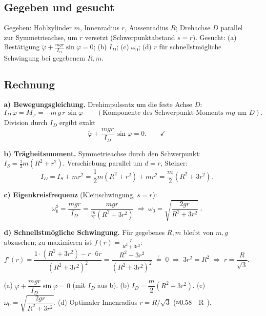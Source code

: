 
\subsection*{Gegeben und gesucht}
Gegeben: Hohlzylinder $m$, Innenradius $r$, Aussenradius $R$; Drehachse $D$
parallel zur Symmetrieachse, um $r$ versetzt (Schwerpunktabstand $s=r$).
Gesucht: (a) Bestätigung $\ddot\varphi+\frac{mgr}{I_D}\sin\varphi=0$;
(b) $I_D$; (c) $\omega_0$; (d) $r$ für schnellstmögliche Schwingung bei
gegebenem $R,m$.

\subsection*{Rechnung}
\textbf{a) Bewegungsgleichung.} Drehimpulssatz um die feste Achse $D$:
\begin{equation}
  I_D\,\ddot\varphi = M_\varphi = -m\,g\,r\,\sin\varphi
  \qquad(\text{Komponente des Schwerpunkt-Moments } m g \text{ um }D).
\end{equation}
Division durch $I_D$ ergibt exakt
\begin{equation}
  \ddot\varphi + \frac{m g r}{I_D}\,\sin\varphi = 0. \qquad\checkmark
\end{equation}

\textbf{b) Trägheitsmoment.} Symmetrieachse durch den Schwerpunkt:
$I_S=\frac12 m(R^2+r^2)$. Verschiebung parallel um $d=r$, Steiner:
\begin{equation}
  I_D = I_S + m r^2
  = \frac12 m(R^2+r^2) + m r^2
  = \frac{m}{2}\left(R^2+3r^2\right). 
\end{equation}

\textbf{c) Eigenkreisfrequenz} (Kleinschwingung, $s=r$):
\begin{equation}
  \omega_0^2 = \frac{m g r}{I_D}
  = \frac{m g r}{\frac m2 (R^2+3r^2)}
  \;\Rightarrow\;
  \omega_0 = \sqrt{\frac{2 g r}{R^2+3r^2}}\;.
\end{equation}

\textbf{d) Schnellstmögliche Schwingung.} Für gegebenes $R,m$ bleibt von $m,g$
abzusehen; zu maximieren ist $f(r)=\frac{r}{R^2+3r^2}$:
\begin{equation}
  f'(r)
  = \frac{1\cdot(R^2+3r^2) - r\cdot 6r}{(R^2+3r^2)^2}
  = \frac{R^2-3r^2}{(R^2+3r^2)^2}
  \;\overset{!}{=}\;0
  \;\Rightarrow\;
  3r^2 = R^2
  \;\Rightarrow\;
  r = \frac{R}{\sqrt3}.
\end{equation}

\begin{ergebnis}
(a) $\ddot\varphi+\dfrac{mgr}{I_D}\sin\varphi=0$ (mit $I_D$ aus b).
(b) $I_D=\dfrac{m}{2}\left(R^2+3r^2\right)$.
(c) $\omega_0=\sqrt{\dfrac{2 g r}{R^2+3r^2}}$.
(d) Optimaler Innenradius $r=R/\sqrt3$ (≈\qty{0.58}\cdot R).
\end{ergebnis}

